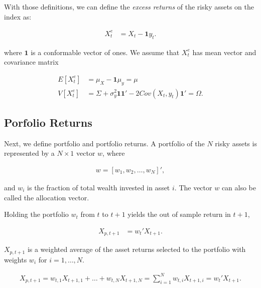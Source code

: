 \documentclass[12pt,oneside,a4paper]{memoir}
\begin{document}
With those definitions, we can define the \textit{excess returns} of the risky assets on the index as:

\vspace{-18 pt}
\begin{align*}
	X^{e}_{t} &= X_{t} - \mathbf{1} y_{t}.
\end{align*}

\noindent
where $\mathbf{1}$ is a conformable vector of ones.
We assume that $X^{e}_{t}$ has mean vector and covariance matrix 

\vspace{-18 pt}
\begin{align*}
E[X^{e}_{t}] &= \mu_{X} - \mathbf{1} \mu_{y}=\mu
\\
V[X^{e}_{t}] &=
\Sigma +
\sigma_{y}^{2} \mathbf{1}\mathbf{1}' -
2Cov(X_{t},y_{t})\mathbf{1}' =\Omega.
\end{align*}

\subsection*{Porfolio Returns}

Next, we define portfolio and portfolio returns.
A portfolio of the $N$ risky assets is represented by a $N\times 1$ vector $w$, where

\vspace{-18 pt}
\begin{align*}
	w = \left[ w_1, w_2 , \dots, w_N \right]',
\end{align*}

\noindent
and $w_{i}$ is the fraction of total wealth invested in asset $i$.
The vector $w$ can also be called the allocation vector.

Holding the portfolio $w_{t}$ from $t$ to $t+1$ yields the out of sample return in $t+1$,

\vspace{-18 pt}
\begin{align} \label{eq:retport}
	X_{p,t+1} &= w_{t}'X_{t+1}.
\end{align}

\noindent
$X_{p,t+1}$ is a weighted average of the asset returns selected to the portfolio with weights $w_{i}$ for $i=1,\dots,N$.

\vspace{-18 pt}
\begin{align*} \label{ret_port}
	X_{p,t+1} =
	w_{t,1} X_{t+1,1} + \dots + w_{t,N} X_{t+1,N} =
	\sum_{i=1}^{N} w_{t,i} X_{t+1,i} = w_{t}'X_{t+1}.
\end{align*}
\end{document}
